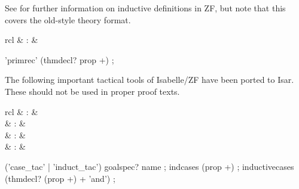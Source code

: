 \begin{isabellebody}
\begin{isamarkuptext}
  See \cite{isabelle-ZF} for further information on inductive
  definitions in ZF, but note that this covers the old-style theory
  format.%
\end{isamarkuptext}%
\isamarkuptrue%
%
\isamarkuptrue%
%
\begin{isamarkuptext}%
\begin{matharray}{rcl}
    \hypertarget{command.ZF.primrec}{\hyperlink{command.ZF.primrec}{\mbox{}}} & : &  \\
  \end{matharray}

  \begin{rail}
    'primrec' (thmdecl? prop +)
    ;
  \end{rail}%
\end{isamarkuptext}%
\isamarkuptrue%
%
\isamarkuptrue%
%
\begin{isamarkuptext}%
The following important tactical tools of Isabelle/ZF have been
  ported to Isar.  These should not be used in proper proof texts.

  \begin{matharray}{rcl}
    \hypertarget{method.ZF.case-tac}{\hyperlink{method.ZF.case-tac}{\mbox{}}}\isa{{\isachardoublequote}\isactrlsup {\isacharasterisk}{\isachardoublequote}} & : & \isarmeth \\
    \hypertarget{method.ZF.induct-tac}{\hyperlink{method.ZF.induct-tac}{\mbox{}}}\isa{{\isachardoublequote}\isactrlsup {\isacharasterisk}{\isachardoublequote}} & : & \isarmeth \\
    \hypertarget{method.ZF.ind-cases}{\hyperlink{method.ZF.ind-cases}{\mbox{}}}\isa{{\isachardoublequote}\isactrlsup {\isacharasterisk}{\isachardoublequote}} & : & \isarmeth \\
    \hypertarget{command.ZF.inductive-cases}{\hyperlink{command.ZF.inductive-cases}{\mbox{}}} & : &  \\
  \end{matharray}

  \begin{rail}
    ('case\_tac' | 'induct\_tac') goalspec? name
    ;
    indcases (prop +)
    ;
    inductivecases (thmdecl? (prop +) + 'and')
    ;
  \end{rail}%
\end{isamarkuptext}%
\isamarkuptrue%
%
\isadelimtheory
%
\endisadelimtheory
%
\isatagtheory
{}\isamarkupfalse%
%
\endisatagtheory
{\isafoldtheory}%
%
\isadelimtheory
%
\endisadelimtheory
\isanewline
\end{isabellebody}%
